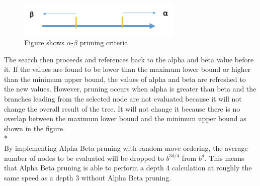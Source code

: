 \documentclass[11pt,a4paper]{article}
\begin{document}
\begin{figure}[H]
\centering
\includegraphics[width=0.7\textwidth]{alphabeta}
\caption{Figure shows $\alpha$-$\beta$ pruning criteria}
\label{fig:chess1}
\end{figure}

\indent The search then proceeds and references back to the alpha and beta value before it. If the values are found to be lower than the maximum lower bound or higher than the minimum upper bound, the values of alpha and beta are refreshed to the new values. However, pruning occurs when alpha is greater than beta and the branches leading from the selected node are not evaluated because it will not change the overall result of the tree. It will not change it because there is no overlap between the maximum lower bound and the minimum upper bound as shown in the figure.\cite{chess3}
\\*\\
\indent By implementing Alpha Beta pruning with random move ordering, the average number of nodes to be evaluated will be dropped to $b^{3d/4}$ from $b^d$. This means that Alpha Beta pruning is able to perform a depth 4 calculation at roughly the same speed as a depth 3 without Alpha Beta pruning.\cite{chess4}
\end{document}
